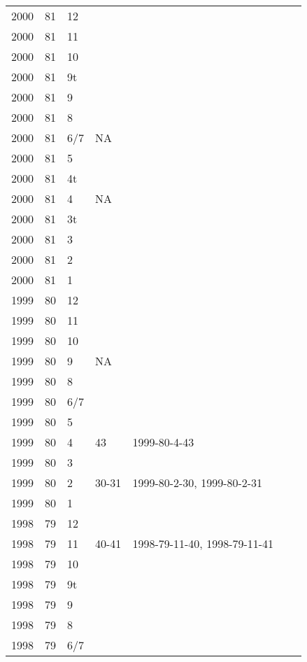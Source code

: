 \begin{longtable}{ |l|l|l|l|p{2.7cm}|l|p{2cm}| }
 2000 & 81 &    12 &         &  &  & \\
 2000 & 81 &    11 &         &  &  & \\
 2000 & 81 &    10 &         &  &  & \\
 2000 & 81 &    9t &         &  &  & \\
 2000 & 81 &     9 &         &  &  & \\
 2000 & 81 &     8 &         &  &  & \\
 2000 & 81 &   6/7 &     NA  &  &  & \\
 2000 & 81 &     5 &         &  &  & \\
 2000 & 81 &    4t &         &  &  & \\
 2000 & 81 &     4 &     NA  &  &  & \\
 2000 & 81 &    3t &         &  &  & \\
 2000 & 81 &     3 &         &  &  & \\
 2000 & 81 &     2 &         &    &  & \\
 2000 & 81 &     1 &         &  &  & \\
 1999 & 80 &    12 &         &  &  & \\
 1999 & 80 &    11 &         &  &  & \\
 1999 & 80 &    10 &         &  &  & \\
 1999 & 80 &     9 &     NA  &  &  & \\
 1999 & 80 &     8 &         &  &  & \\
 1999 & 80 &   6/7 &         &  &  & \\
 1999 & 80 &     5 &         &  &  & \\
 1999 & 80 &     4 &   43    & 1999-80-4-43  &  & \\
 1999 & 80 &     3 &         &  &  & \\
 1999 & 80 &     2 &   30-31 & 1999-80-2-30, 1999-80-2-31 &  & \\
 1999 & 80 &     1 &         &  &  & \\
 1998 & 79 &    12 &         &  &  & \\
 1998 & 79 &    11 &  40-41  & 1998-79-11-40, 1998-79-11-41  &  & \\
 1998 & 79 &    10 &         &  &  & \\
 1998 & 79 &    9t &         &  &  & \\
 1998 & 79 &     9 &         &  &  & \\
 1998 & 79 &     8 &         &  &  & \\
 1998 & 79 &   6/7 &         &  &  & \\

\end{longtable}
